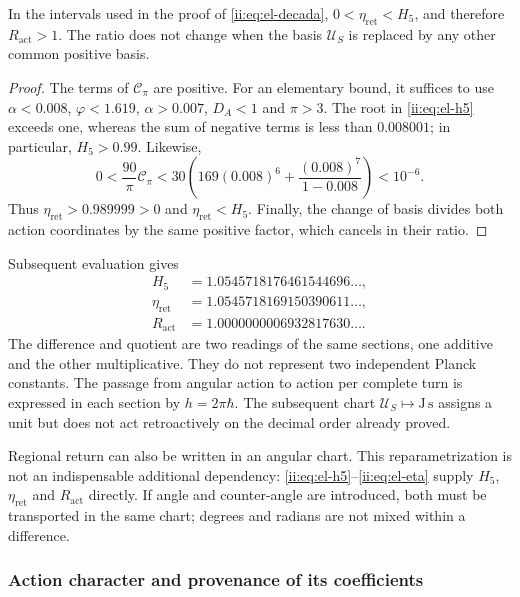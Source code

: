 \begin{proposition}
In the intervals used in the proof of \eqref{ii:eq:el-decada}, \(0<\eta_{\mathrm{ret}}<H_5\), and therefore \(R_{\mathrm{act}}>1\). The ratio does not change when the basis \(\mathcal U_S\) is replaced by any other common positive basis.
\end{proposition}
\begin{proof}
The terms of \(\mathcal C_\pi\) are positive. For an elementary bound, it suffices to use \(\alpha<0.008\), \(\varphi<1.619\), \(\alpha>0.007\), \(D_A<1\) and \(\pi>3\). The root in \eqref{ii:eq:el-h5} exceeds one, whereas the sum of negative terms is less than \(0.008001\); in particular, \(H_5>0.99\). Likewise,
\[
 0<\frac{90}{\pi}\mathcal C_\pi
 <30\left(169(0.008)^6+
           \frac{(0.008)^7}{1-0.008}\right)<10^{-6}.
\]
Thus \(\eta_{\mathrm{ret}}>0.989999>0\) and \(\eta_{\mathrm{ret}}<H_5\). Finally, the change of basis divides both action coordinates by the same positive factor, which cancels in their ratio.
\end{proof}

Subsequent evaluation gives
\begin{align*}
 H_5&=1.0545718176461544696\ldots,\\
 \eta_{\mathrm{ret}}&=1.0545718169150390611\ldots,\\
 R_{\mathrm{act}}&=1.0000000006932817630\ldots.
\end{align*}
The difference and quotient are two readings of the same sections, one additive and the other multiplicative. They do not represent two independent Planck constants. The passage from angular action to action per complete turn is expressed in each section by \(h=2\pi\hbar\). The subsequent chart \(\mathcal U_S\mapsto\mathrm{J\,s}\) assigns a unit but does not act retroactively on the decimal order already proved.

Regional return can also be written in an angular chart. This reparametrization is not an indispensable additional dependency: \eqref{ii:eq:el-h5}--\eqref{ii:eq:el-eta} supply \(H_5\), \(\eta_{\mathrm{ret}}\) and \(R_{\mathrm{act}}\) directly. If angle and counter-angle are introduced, both must be transported in the same chart; degrees and radians are not mixed within a difference.


\subsubsection{Action character and provenance of its coefficients}
\label{ii:sec:revision-planck}

